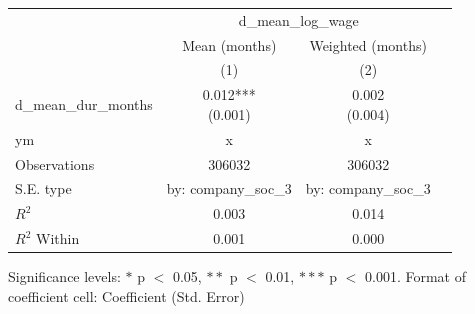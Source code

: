 \renewcommand\cellalign{t}
\begin{threeparttable}
\begin{tabular}{lccc}
\toprule
 & \multicolumn{2}{c}{d_mean_log_wage} \\
\cmidrule(lr){2-3} 
 & Mean (months) & Weighted (months) \\
 & (1) & (2) \\
\midrule
\addlinespace
d_mean_dur_months & \makecell{0.012*** \\ (0.001)} & \makecell{0.002 \\ (0.004)} \\
\midrule
\addlinespace
ym & x & x \\
\midrule
\addlinespace
Observations & 306032 & 306032 \\
S.E. type & by: company_soc_3 & by: company_soc_3 \\
$R^2$ & 0.003 & 0.014 \\
$R^2$ Within & 0.001 & 0.000 \\
\bottomrule
\end{tabular}
\footnotesize Significance levels: $*$ p $<$ 0.05, $**$ p $<$ 0.01, $***$ p $<$ 0.001. Format of coefficient cell: Coefficient 
 (Std. Error)
\end{threeparttable}